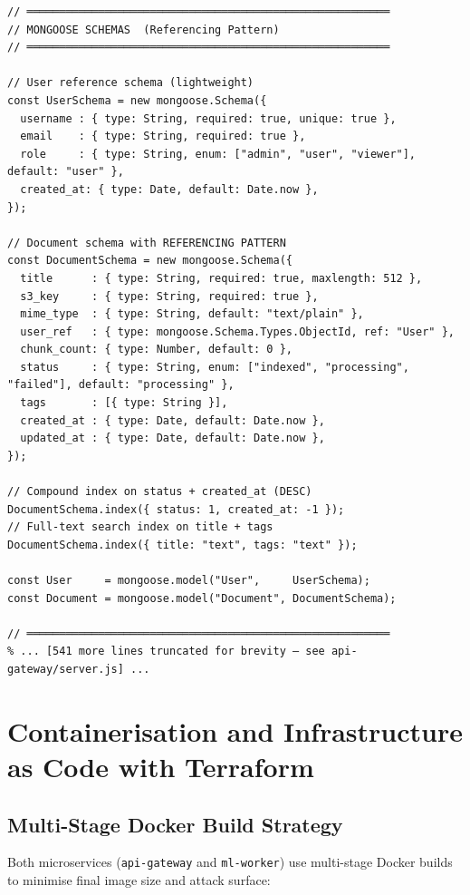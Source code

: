 \documentclass[12pt,a4paper]{report}
\begin{document}
\begin{lstlisting}
// ════════════════════════════════════════════════════════
// MONGOOSE SCHEMAS  (Referencing Pattern)
// ════════════════════════════════════════════════════════

// User reference schema (lightweight)
const UserSchema = new mongoose.Schema({
  username : { type: String, required: true, unique: true },
  email    : { type: String, required: true },
  role     : { type: String, enum: ["admin", "user", "viewer"], default: "user" },
  created_at: { type: Date, default: Date.now },
});

// Document schema with REFERENCING PATTERN
const DocumentSchema = new mongoose.Schema({
  title      : { type: String, required: true, maxlength: 512 },
  s3_key     : { type: String, required: true },
  mime_type  : { type: String, default: "text/plain" },
  user_ref   : { type: mongoose.Schema.Types.ObjectId, ref: "User" },
  chunk_count: { type: Number, default: 0 },
  status     : { type: String, enum: ["indexed", "processing", "failed"], default: "processing" },
  tags       : [{ type: String }],
  created_at : { type: Date, default: Date.now },
  updated_at : { type: Date, default: Date.now },
});

// Compound index on status + created_at (DESC)
DocumentSchema.index({ status: 1, created_at: -1 });
// Full-text search index on title + tags
DocumentSchema.index({ title: "text", tags: "text" });

const User     = mongoose.model("User",     UserSchema);
const Document = mongoose.model("Document", DocumentSchema);

// ════════════════════════════════════════════════════════
% ... [541 more lines truncated for brevity — see api-gateway/server.js] ...
\end{lstlisting}
\newpage


\chapter{Containerisation and Infrastructure as Code with Terraform}

\section{Multi-Stage Docker Build Strategy}

Both microservices (\texttt{api-gateway} and \texttt{ml-worker}) use multi-stage
Docker builds to minimise final image size and attack surface:
\end{document}
